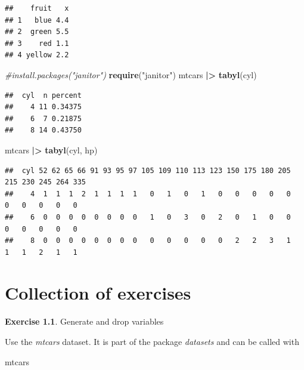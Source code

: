 \documentclass[
  12pt,
  oneside]{book}
\newenvironment{Shaded}{\begin{snugshade}}{\end{snugshade}}
\newcommand{\CommentTok}[1]{\textcolor[rgb]{0.56,0.35,0.01}{\textit{#1}}}
\newcommand{\FunctionTok}[1]{\textcolor[rgb]{0.13,0.29,0.53}{\textbf{#1}}}
\newcommand{\NormalTok}[1]{#1}
\newcommand{\SpecialCharTok}[1]{\textcolor[rgb]{0.81,0.36,0.00}{\textbf{#1}}}
\newcommand{\StringTok}[1]{\textcolor[rgb]{0.31,0.60,0.02}{#1}}
\theoremstyle{definition}
\theoremstyle{definition}
\theoremstyle{definition}
\newtheorem{exercise}{Exercise}[chapter]
\theoremstyle{definition}
\theoremstyle{remark}
\begin{document}
\begin{verbatim}
##    fruit   x
## 1   blue 4.4
## 2  green 5.5
## 3    red 1.1
## 4 yellow 2.2
\end{verbatim}

\begin{Shaded}
\begin{Highlighting}[]
\CommentTok{\#install.packages("janitor")}
\FunctionTok{require}\NormalTok{(}\StringTok{"janitor"}\NormalTok{)}
\NormalTok{mtcars }\SpecialCharTok{|\textgreater{}} 
  \FunctionTok{tabyl}\NormalTok{(cyl) }
\end{Highlighting}
\end{Shaded}

\begin{verbatim}
##  cyl  n percent
##    4 11 0.34375
##    6  7 0.21875
##    8 14 0.43750
\end{verbatim}

\begin{Shaded}
\begin{Highlighting}[]
\NormalTok{mtcars }\SpecialCharTok{|\textgreater{}} 
  \FunctionTok{tabyl}\NormalTok{(cyl, hp) }
\end{Highlighting}
\end{Shaded}

\begin{verbatim}
##  cyl 52 62 65 66 91 93 95 97 105 109 110 113 123 150 175 180 205 215 230 245 264 335
##    4  1  1  1  2  1  1  1  1   0   1   0   1   0   0   0   0   0   0   0   0   0   0
##    6  0  0  0  0  0  0  0  0   1   0   3   0   2   0   1   0   0   0   0   0   0   0
##    8  0  0  0  0  0  0  0  0   0   0   0   0   0   2   2   3   1   1   1   2   1   1
\end{verbatim}

\hypertarget{collection-of-exercises}{%
\chapter{Collection of exercises}\label{collection-of-exercises}}

\begin{exercise}
\protect\hypertarget{exr:genanddrop}{}\label{exr:genanddrop}Generate and drop variables

Use the \emph{mtcars} dataset. It is part of the package \emph{datasets} and can be called with
\end{exercise}

\begin{Shaded}
\begin{Highlighting}[]
\NormalTok{mtcars}
\end{Highlighting}
\end{Shaded}
\end{document}
